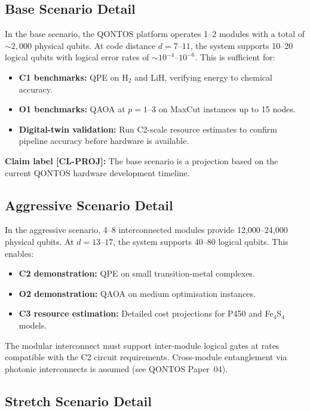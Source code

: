 \documentclass[conference]{IEEEtran}
\begin{document}
\subsection{Base Scenario Detail}

In the base scenario, the QONTOS platform operates 1--2 modules with a total of
${\sim}2{,}000$ physical qubits. At code distance $d = 7$--$11$, the system supports 10--20
logical qubits with logical error rates of ${\sim}10^{-4}$--$10^{-6}$. This is sufficient for:

\begin{itemize}[leftmargin=*]
\item \textbf{C1 benchmarks:} QPE on H$_2$ and LiH, verifying energy to chemical accuracy.
\item \textbf{O1 benchmarks:} QAOA at $p = 1$--$3$ on MaxCut instances up to 15 nodes.
\item \textbf{Digital-twin validation:} Run C2-scale resource estimates to confirm
  pipeline accuracy before hardware is available.
\end{itemize}

\textbf{Claim label [CL-PROJ]:} The base scenario is a projection based on the current
QONTOS hardware development timeline.

\subsection{Aggressive Scenario Detail}

In the aggressive scenario, 4--8 interconnected modules provide 12,000--24,000
physical qubits. At $d = 13$--$17$, the system supports 40--80 logical qubits. This
enables:

\begin{itemize}[leftmargin=*]
\item \textbf{C2 demonstration:} QPE on small transition-metal complexes.
\item \textbf{O2 demonstration:} QAOA on medium optimisation instances.
\item \textbf{C3 resource estimation:} Detailed cost projections for P450 and Fe$_4$S$_4$ models.
\end{itemize}

The modular interconnect must support inter-module logical gates at rates compatible
with the C2 circuit requirements. Cross-module entanglement via photonic interconnects
is assumed (see QONTOS Paper~04).

\subsection{Stretch Scenario Detail}
\end{document}
